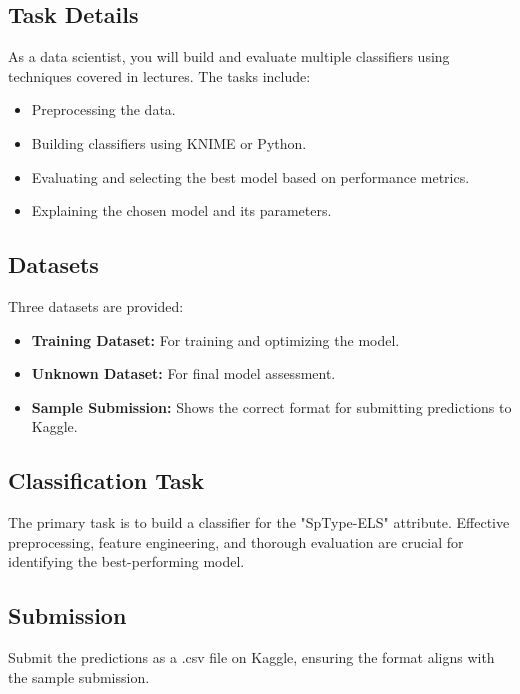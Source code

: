 \subsection{Task Details}
As a data scientist, you will build and evaluate multiple classifiers using techniques covered in lectures. The tasks include:
\begin{itemize}
    \item Preprocessing the data.
    \item Building classifiers using KNIME or Python.
    \item Evaluating and selecting the best model based on performance metrics.
    \item Explaining the chosen model and its parameters.
\end{itemize}

\subsection{Datasets}
Three datasets are provided:
\begin{itemize}
    \item \textbf{Training Dataset:} For training and optimizing the model.
    \item \textbf{Unknown Dataset:} For final model assessment.
    \item \textbf{Sample Submission:} Shows the correct format for submitting predictions to Kaggle.
\end{itemize}

\subsection{Classification Task}
The primary task is to build a classifier for the "SpType-ELS" attribute. Effective preprocessing, feature engineering, and thorough evaluation are crucial for identifying the best-performing model.

\subsection{Submission}
Submit the predictions as a .csv file on Kaggle, ensuring the format aligns with the sample submission.
